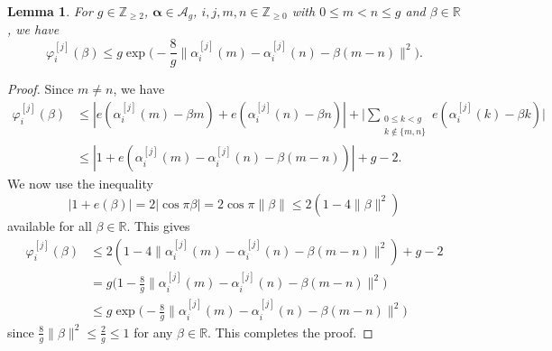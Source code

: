 \documentclass[hidelinks]{amsart}
\numberwithin{equation}{section}
\theoremstyle{plain}
\newtheorem{lemma}{Lemma}
\theoremstyle{definition}
\let\tmp\phi
\let\phi\varphi
\let\varphi\tmp
\let\tmp\epsilon
\let\epsilon\varepsilon
\let\varepsilon\tmp
\begin{document}
\begin{lemma}
\label{lem:phi_bound}
For $g\in\mathbb{Z}_{\ge2}$, $\bm{\alpha}\in\mathscr{A}_{g}$,
$i,j,m,n\in\mathbb{Z}_{\ge0}$ with $0\le m<n\le g$
and $\beta\in\mathbb{R}$, we have
\[
\phi_{i}^{[j]}(\beta)
\le
g\exp\biggl(-\frac{8}{g}\|\alpha_{i}^{[j]}(m)-\alpha_{i}^{[j]}(n)-\beta(m-n)\|^{2}\biggr).
\]
\end{lemma}
\begin{proof}
Since $m\neq n$, we have
\begin{align}
\phi_{i}^{[j]}(\beta)
&\le
|e(\alpha_{i}^{[j]}(m)-\beta m)
+
e(\alpha_{i}^{[j]}(n)-\beta n)|
+
\biggl|
\sum_{\substack{
0\le k<g\\
k\not\in\{m,n\}
}}
e(\alpha_{i}^{[j]}(k)-\beta k)
\biggr|\\
&\le
|1+e(\alpha_{i}^{[j]}(m)-\alpha_{i}^{[j]}(n)-\beta(m-n))|
+
g-2.
\end{align}
We now use the inequality
\[
|1+e(\beta)|
=
2|\cos\pi\beta|
=
2\cos\pi\|\beta\|
\le
2(1-4\|\beta\|^{2})
\]
available for all $\beta\in\mathbb{R}$. This gives
\begin{align}
\phi_{i}^{[j]}(\beta)
&\le
2(1-4\|\alpha_{i}^{[j]}(m)-\alpha_{i}^{[j]}(n)-\beta(m-n)\|^{2})
+
g-2\\
&=
g\biggl(1-\frac{8}{g}\|\alpha_{i}^{[j]}(m)-\alpha_{i}^{[j]}(n)-\beta(m-n)\|^{2}\biggr)\\
&\le
g\exp\biggl(-\frac{8}{g}\|\alpha_{i}^{[j]}(m)-\alpha_{i}^{[j]}(n)-\beta(m-n)\|^{2}\biggr)
\end{align}
since $\frac{8}{g}\|\beta\|^{2}\le\frac{2}{g}\le1$ for any $\beta\in\mathbb{R}$.
This completes the proof.
\end{proof}
\end{document}
